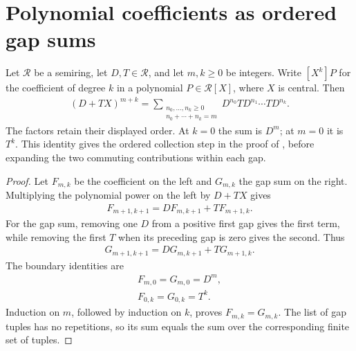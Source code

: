 \section{Polynomial coefficients as ordered gap sums}

\begin{theorem}
    \label{thm:polynomial_ordered_gaps}
    \leanok
    Let $\mathcal R$ be a semiring, let $D,T\in\mathcal R$, and let
    $m,k\ge0$ be integers. Write $[X^k]P$ for the coefficient of degree $k$
    in a polynomial $P\in\mathcal R[X]$, where $X$ is central. Then
    \begin{align*}
        [X^k](D+TX)^{m+k}
        =\sum_{\substack{n_0,\ldots,n_k\ge0\\n_0+\cdots+n_k=m}}
            D^{n_0}TD^{n_1}\cdots TD^{n_k}.
    \end{align*}
    The factors retain their displayed order. At $k=0$ the sum is $D^m$;
    at $m=0$ it is $T^k$.
    This identity gives the ordered collection step in the proof of
    \cite[Lemma~4.2]{Arad2013AreaLaw}, before expanding the two commuting
    contributions within each gap.
\end{theorem}
\begin{proof}
    \leanok
    Let $F_{m,k}$ be the coefficient on the left and $G_{m,k}$ the gap sum
    on the right. Multiplying the polynomial power on the left by $D+TX$
    gives
    \begin{align*}
        F_{m+1,k+1}=D F_{m,k+1}+T F_{m+1,k}.
    \end{align*}
    For the gap sum, removing one $D$ from a positive first gap gives the
    first term, while removing the first $T$ when its preceding gap is zero
    gives the second. Thus
    \begin{align*}
        G_{m+1,k+1}=D G_{m,k+1}+T G_{m+1,k}.
    \end{align*}
    The boundary identities are
    \begin{align*}
        F_{m,0}=G_{m,0}=D^m, \\
        F_{0,k}=G_{0,k}=T^k.
    \end{align*}
    Induction on $m$, followed by induction on $k$, proves $F_{m,k}=G_{m,k}$.
    The list of gap tuples has no repetitions, so its sum equals the sum
    over the corresponding finite set of tuples.
\end{proof}
